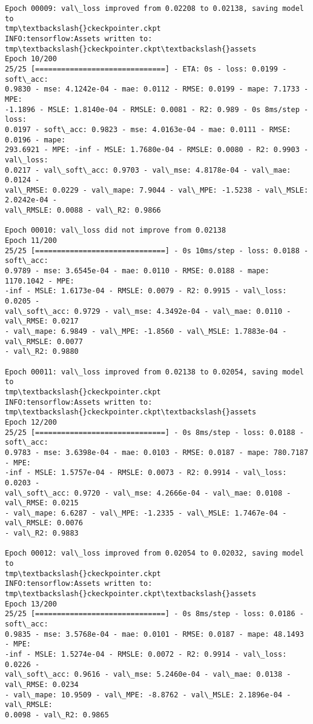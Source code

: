 \documentclass[11pt]{article}
\begin{document}
\begin{Verbatim}[commandchars=\\\{\}]
Epoch 00009: val\_loss improved from 0.02208 to 0.02138, saving model to
tmp\textbackslash{}ckeckpointer.ckpt
INFO:tensorflow:Assets written to: tmp\textbackslash{}ckeckpointer.ckpt\textbackslash{}assets
Epoch 10/200
25/25 [==============================] - ETA: 0s - loss: 0.0199 - soft\_acc:
0.9830 - mse: 4.1242e-04 - mae: 0.0112 - RMSE: 0.0199 - mape: 7.1733 - MPE:
-1.1896 - MSLE: 1.8140e-04 - RMSLE: 0.0081 - R2: 0.989 - 0s 8ms/step - loss:
0.0197 - soft\_acc: 0.9823 - mse: 4.0163e-04 - mae: 0.0111 - RMSE: 0.0196 - mape:
293.6921 - MPE: -inf - MSLE: 1.7680e-04 - RMSLE: 0.0080 - R2: 0.9903 - val\_loss:
0.0217 - val\_soft\_acc: 0.9703 - val\_mse: 4.8178e-04 - val\_mae: 0.0124 -
val\_RMSE: 0.0229 - val\_mape: 7.9044 - val\_MPE: -1.5238 - val\_MSLE: 2.0242e-04 -
val\_RMSLE: 0.0088 - val\_R2: 0.9866

Epoch 00010: val\_loss did not improve from 0.02138
Epoch 11/200
25/25 [==============================] - 0s 10ms/step - loss: 0.0188 - soft\_acc:
0.9789 - mse: 3.6545e-04 - mae: 0.0110 - RMSE: 0.0188 - mape: 1170.1042 - MPE:
-inf - MSLE: 1.6173e-04 - RMSLE: 0.0079 - R2: 0.9915 - val\_loss: 0.0205 -
val\_soft\_acc: 0.9729 - val\_mse: 4.3492e-04 - val\_mae: 0.0110 - val\_RMSE: 0.0217
- val\_mape: 6.9849 - val\_MPE: -1.8560 - val\_MSLE: 1.7883e-04 - val\_RMSLE: 0.0077
- val\_R2: 0.9880

Epoch 00011: val\_loss improved from 0.02138 to 0.02054, saving model to
tmp\textbackslash{}ckeckpointer.ckpt
INFO:tensorflow:Assets written to: tmp\textbackslash{}ckeckpointer.ckpt\textbackslash{}assets
Epoch 12/200
25/25 [==============================] - 0s 8ms/step - loss: 0.0188 - soft\_acc:
0.9783 - mse: 3.6398e-04 - mae: 0.0103 - RMSE: 0.0187 - mape: 780.7187 - MPE:
-inf - MSLE: 1.5757e-04 - RMSLE: 0.0073 - R2: 0.9914 - val\_loss: 0.0203 -
val\_soft\_acc: 0.9720 - val\_mse: 4.2666e-04 - val\_mae: 0.0108 - val\_RMSE: 0.0215
- val\_mape: 6.6287 - val\_MPE: -1.2335 - val\_MSLE: 1.7467e-04 - val\_RMSLE: 0.0076
- val\_R2: 0.9883

Epoch 00012: val\_loss improved from 0.02054 to 0.02032, saving model to
tmp\textbackslash{}ckeckpointer.ckpt
INFO:tensorflow:Assets written to: tmp\textbackslash{}ckeckpointer.ckpt\textbackslash{}assets
Epoch 13/200
25/25 [==============================] - 0s 8ms/step - loss: 0.0186 - soft\_acc:
0.9835 - mse: 3.5768e-04 - mae: 0.0101 - RMSE: 0.0187 - mape: 48.1493 - MPE:
-inf - MSLE: 1.5274e-04 - RMSLE: 0.0072 - R2: 0.9914 - val\_loss: 0.0226 -
val\_soft\_acc: 0.9616 - val\_mse: 5.2460e-04 - val\_mae: 0.0138 - val\_RMSE: 0.0234
- val\_mape: 10.9509 - val\_MPE: -8.8762 - val\_MSLE: 2.1896e-04 - val\_RMSLE:
0.0098 - val\_R2: 0.9865


\end{Verbatim}
\end{document}
